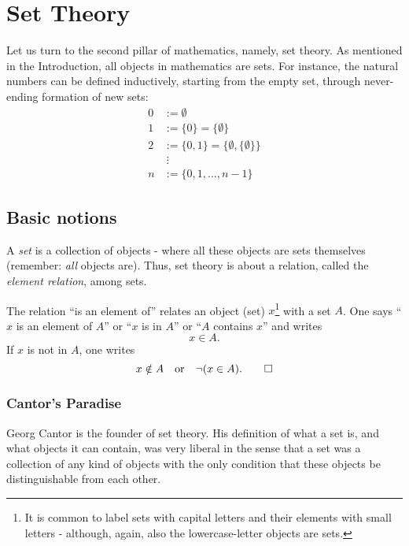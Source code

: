 \clearpage
\section{Set Theory}\label{sec:set-theory}

Let us turn to the second pillar of mathematics, namely, set theory. As mentioned in the Introduction, all objects in mathematics are sets. For instance, the natural numbers can be defined inductively, starting from the empty set, through never-ending formation of new sets:
\[
\begin{aligned}
0 &:=\emptyset\\
1 &:=\{0\}=\{\emptyset\}\\
2 &:=\{0,1\}=\{\emptyset,\{\emptyset\}\}\\
&\;\vdots\\
n &:=\{0,1,\dots ,n-1\}
\end{aligned}
\]

\subsection{Basic notions}\label{subsec:basic-notions}


A \textit{set} is a collection of objects - where all these objects are sets themselves (remember: \emph{all} objects are). 
Thus, set theory is about a relation, called the \emph{element relation}, among sets.

\begin{definition}\label{def:element-relation}
  The relation ``is an element of'' relates an object (set) \(x\)\footnote{It is common to label sets with capital letters and their elements with small letters - although, again, also the lowercase-letter objects are sets.}
  with a set \(A\).  One says ``\(x\) is an element of \(A\)'' or ``\(x\) is in \(A\)'' or ``\(A\) contains \(x\)'' and writes
  \[
  x \in A .
  \]
  If \(x\) is not in \(A\), one writes
  \[
  x \notin A \quad\text{or}\quad \neg (x\in A). \qedhere
  \]
\end{definition}


\subsubsection{Cantor's Paradise}\label{subsubsec:cantor}
    
Georg Cantor is the founder of set theory.  
His definition of what a set is, and what objects it can contain, was very liberal in the sense that a set was a collection of any kind of objects with the only condition that these objects be distinguishable from each other.

